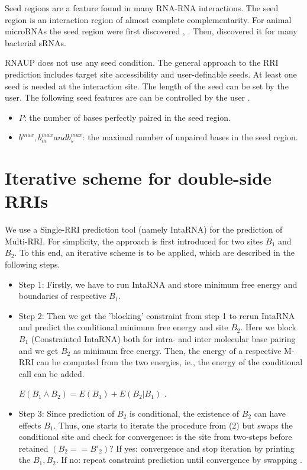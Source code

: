 \documentclass[twoside,a4paper]{report}
\begin{document}
	
	Seed regions are a feature found in many RNA-RNA interactions. The seed region is an interaction region of almost complete complementarity. For animal microRNAs the seed region were first discovered \citep{bentwich2005prediction} , \citep{brennecke2005principles}. Then, \citet{tjaden2006target} discovered it for many bacterial sRNAs. 
	
	 RNAUP does not use any seed condition. The general approach to the RRI prediction includes target site accessibility and user-definable seeds. At least one seed is needed at the interaction site. The length of the seed can be set by the user. The following seed features are can be controlled by the user \citep{busch2008intarna}. 
	
	\begin{itemize}
	
	\item $P$: the number of bases perfectly paired in the seed region.
	\item $b^{max} , b^{max}_m and b^{max}_s$: the maximal number of unpaired bases in the seed region.
	
	\end{itemize}
	
	
	
	\section{Iterative scheme for double-side RRIs}
	 We use a Single-RRI prediction tool (namely IntaRNA) for the prediction of Multi-RRI. For simplicity, the approach is first introduced for two sites $B_1$ and $B_2$. To this end, an iterative scheme is to be applied, which are described in the following steps.
	
	 
	 \begin{itemize}
	 	 
	
	 \item Step 1: Firstly, we have to run IntaRNA and store minimum free energy and boundaries of respective $B_1$.
	 \item Step 2: Then we get the 'blocking' constraint from step 1 to rerun IntaRNA and predict the conditional minimum free energy and site $B_2$. Here we block $B_1$ (Constrainted IntaRNA) both for intra- and inter molecular base pairing and we get $B_2$ as minimum free energy. Then, the energy of a respective M-RRI can be computed from the two energies, ie., the energy of the conditional call can be added. \\
	 \begin{center}
	 	 $E(B_1 \land B_2) = E(B_1) + E(B_2 | B_1)$ .
	 \end{center}
	 
	 \item Step 3: Since prediction of $B_2$ is conditional, the existence of $B_2$ can have effects $B_1$. Thus, one starts to iterate the procedure from (2) but swaps the conditional site and check for convergence: is the site from two-steps before retained $(B_2 == B'_2)$? If yes: convergence and stop iteration by printing the  $B_1 , B_2$. If no: repeat constraint prediction until convergence by swapping .
	 
	  \end{itemize}
  
\end{document}
